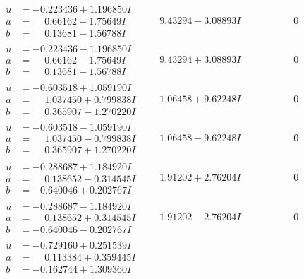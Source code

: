 \documentclass[1p]{elsarticle_modified}
\theoremstyle{definition}
\begin{document}
$$\begin{array}{c|c|c}
\begin{aligned}
u &= -0.223436 + 1.196850 I \\
a &= \phantom{-}0.66162 + 1.75649 I \\
b &= \phantom{-}0.13681 - 1.56788 I\end{aligned}
 & \phantom{-}9.43294 - 3.08893 I & \phantom{-0.000000 } 0 \\ \hline\begin{aligned}
u &= -0.223436 - 1.196850 I \\
a &= \phantom{-}0.66162 - 1.75649 I \\
b &= \phantom{-}0.13681 + 1.56788 I\end{aligned}
 & \phantom{-}9.43294 + 3.08893 I & \phantom{-0.000000 } 0 \\ \hline\begin{aligned}
u &= -0.603518 + 1.059190 I \\
a &= \phantom{-}1.037450 + 0.799838 I \\
b &= \phantom{-}0.365907 - 1.270220 I\end{aligned}
 & \phantom{-}1.06458 + 9.62248 I & \phantom{-0.000000 } 0 \\ \hline\begin{aligned}
u &= -0.603518 - 1.059190 I \\
a &= \phantom{-}1.037450 - 0.799838 I \\
b &= \phantom{-}0.365907 + 1.270220 I\end{aligned}
 & \phantom{-}1.06458 - 9.62248 I & \phantom{-0.000000 } 0 \\ \hline\begin{aligned}
u &= -0.288687 + 1.184920 I \\
a &= \phantom{-}0.138652 - 0.314545 I \\
b &= -0.640046 + 0.202767 I\end{aligned}
 & \phantom{-}1.91202 + 2.76204 I & \phantom{-0.000000 } 0 \\ \hline\begin{aligned}
u &= -0.288687 - 1.184920 I \\
a &= \phantom{-}0.138652 + 0.314545 I \\
b &= -0.640046 - 0.202767 I\end{aligned}
 & \phantom{-}1.91202 - 2.76204 I & \phantom{-0.000000 } 0 \\ \hline\begin{aligned}
u &= -0.729160 + 0.251539 I \\
a &= \phantom{-}0.113384 + 0.359445 I \\
b &= -0.162744 + 1.309360 I\end{aligned}

\end{array}$$
\end{document}
